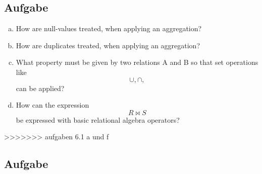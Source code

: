 \documentclass[11pt,a4paper,DIV=9]{scrartcl}
\newcounter{temp}
\newcommand{\aufgabe}[1]{
  \setcounter{temp}{\value{subsection}}
  \setcounter{subsection}{#1}
  \addtocounter{subsection}{-1}
  \subsection{Aufgabe}
  \setcounter{subsection}{\value{temp}}
}
\begin{document}
\aufgabe{2}
  \begin{enumerate}[a)]
   \item How are null-values treated, when applying an aggregation?
   \item How are duplicates treated, when applying an aggregation?
   \item What property must be given by two relations A and B so that set operations like \begin{displaymath}
  \cup, \cap,    \end{displaymath} can be applied?
  \item How can the expression \begin{displaymath}R \Join S\end{displaymath} be expressed with basic relational algebra operators?
  \end{enumerate}

>>>>>>> aufgaben 6.1 a und f
\aufgabe{3}
\end{document}
